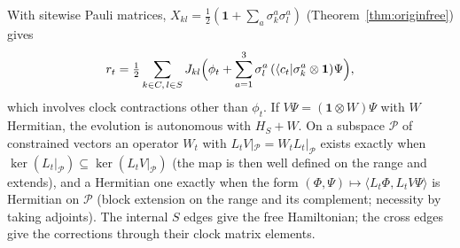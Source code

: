 \documentclass[aps,pra,onecolumn,superscriptaddress,nofootinbib,10pt]{revtex4-2}
\theoremstyle{definition}
\theoremstyle{remark}
\newcommand{\ip}[2]{\langle #1,#2\rangle}
\begin{document}
With sitewise Pauli matrices, $X_{kl}=\tfrac12(\mathbf1+\sum_a\sigma^a_k\sigma^a_l)$ (Theorem~\ref{thm:originfree}) gives
\begin{equation}\label{eq:cuexsource}
r_t=\tfrac12\sum_{k\in C,\,l\in S}J_{kl}\Bigl(\phi_t+\sum_{a=1}^3\sigma^a_l\,(\langle c_t\rvert\sigma^a_k\otimes\mathbf1)\Psi\Bigr),
\end{equation}
which involves clock contractions other than $\phi_t$.  If $V\Psi=(\mathbf1\otimes W)\Psi$ with $W$ Hermitian, the evolution is
autonomous with $H_S+W$.  On a subspace $\mathcal P$ of constrained vectors an operator $W_t$ with $L_tV|_{\mathcal P}=W_tL_t|_{\mathcal P}$ exists
exactly when $\ker(L_t|_{\mathcal P})\subseteq\ker(L_tV|_{\mathcal P})$ (the map is then well defined on the range and extends), and a
Hermitian one exactly when the form $(\Phi,\Psi)\mapsto\ip{L_t\Phi}{L_tV\Psi}$ is Hermitian on $\mathcal P$ (block extension on the range and
its complement; necessity by taking adjoints).  The internal $S$ edges give the free Hamiltonian; the cross
edges give the corrections through their clock matrix elements.
\end{document}
